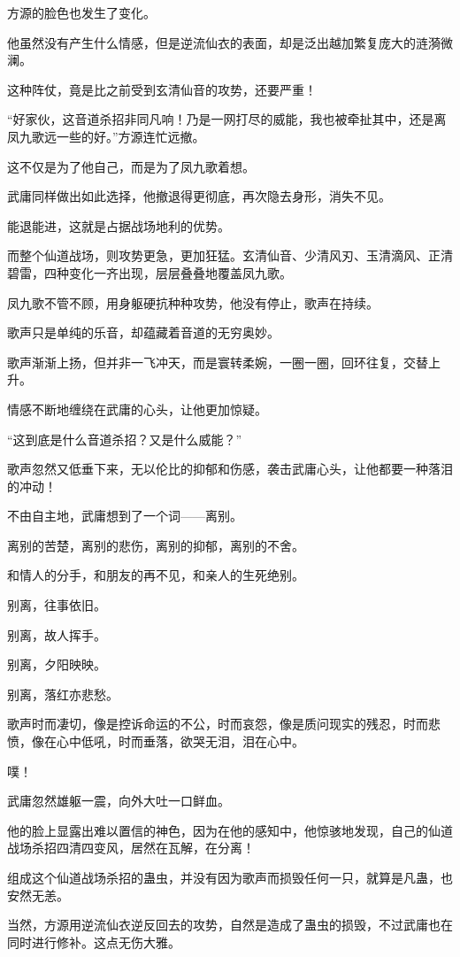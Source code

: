 \begin{this_body}
方源的脸色也发生了变化。

他虽然没有产生什么情感，但是逆流仙衣的表面，却是泛出越加繁复庞大的涟漪微澜。

这种阵仗，竟是比之前受到玄清仙音的攻势，还要严重！

“好家伙，这音道杀招非同凡响！乃是一网打尽的威能，我也被牵扯其中，还是离凤九歌远一些的好。”方源连忙远撤。

这不仅是为了他自己，而是为了凤九歌着想。

武庸同样做出如此选择，他撤退得更彻底，再次隐去身形，消失不见。

能退能进，这就是占据战场地利的优势。

而整个仙道战场，则攻势更急，更加狂猛。玄清仙音、少清风刃、玉清滴风、正清碧雷，四种变化一齐出现，层层叠叠地覆盖凤九歌。

凤九歌不管不顾，用身躯硬抗种种攻势，他没有停止，歌声在持续。

歌声只是单纯的乐音，却蕴藏着音道的无穷奥妙。

歌声渐渐上扬，但并非一飞冲天，而是寰转柔婉，一圈一圈，回环往复，交替上升。

情感不断地缠绕在武庸的心头，让他更加惊疑。

“这到底是什么音道杀招？又是什么威能？”

歌声忽然又低垂下来，无以伦比的抑郁和伤感，袭击武庸心头，让他都要一种落泪的冲动！

不由自主地，武庸想到了一个词——离别。

离别的苦楚，离别的悲伤，离别的抑郁，离别的不舍。

和情人的分手，和朋友的再不见，和亲人的生死绝别。

别离，往事依旧。

别离，故人挥手。

别离，夕阳映映。

别离，落红亦悲愁。

歌声时而凄切，像是控诉命运的不公，时而哀怨，像是质问现实的残忍，时而悲愤，像在心中低吼，时而垂落，欲哭无泪，泪在心中。

噗！

武庸忽然雄躯一震，向外大吐一口鲜血。

他的脸上显露出难以置信的神色，因为在他的感知中，他惊骇地发现，自己的仙道战场杀招四清四变风，居然在瓦解，在分离！

组成这个仙道战场杀招的蛊虫，并没有因为歌声而损毁任何一只，就算是凡蛊，也安然无恙。

当然，方源用逆流仙衣逆反回去的攻势，自然是造成了蛊虫的损毁，不过武庸也在同时进行修补。这点无伤大雅。


\end{this_body}
